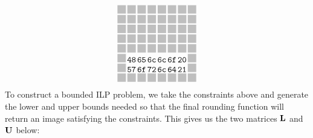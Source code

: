 \begin{equation}
\begin{array}{c@{\hspace{1.5pt}}c@{\hspace{1.5pt}}c@{\hspace{1.5pt}}c@{\hspace{1.5pt}}c@{\hspace{1.5pt}}c@{\hspace{1.5pt}}c@{\hspace{1.5pt}}c}
\gbox & \gbox & \gbox & \gbox & \gbox & \gbox & \gbox & \gbox\\[-2pt]
\gbox & \gbox & \gbox & \gbox & \gbox & \gbox & \gbox & \gbox\\[-2pt]
\gbox & \gbox & \gbox & \gbox & \gbox & \gbox & \gbox & \gbox\\[-2pt]
\gbox & \gbox & \gbox & \gbox & \gbox & \gbox & \gbox & \gbox\\[-2pt]
\gbox & \gbox & \gbox & \gbox & \gbox & \gbox & \gbox & \gbox\\[-2pt]
\gbox & \mtt{48} & \mtt{65} & \mtt{6c} & \mtt{6c} & \mtt{6f} & \mtt{20} & \gbox\\[-2pt]
\gbox & \mtt{57} & \mtt{6f} & \mtt{72} & \mtt{6c} & \mtt{64} & \mtt{21} & \gbox\\[-2pt]
\gbox & \gbox & \gbox & \gbox & \gbox & \gbox & \gbox & \gbox\\[-2pt]
\end{array}
\end{equation}
%
To construct a bounded ILP problem, we take the constraints above and
generate the lower and upper bounds needed so that the final rounding
function will return an image satisfying the constraints.  This gives us
the two matrices $\mathbf{L}$ and $\mathbf{U}$ below:
%
